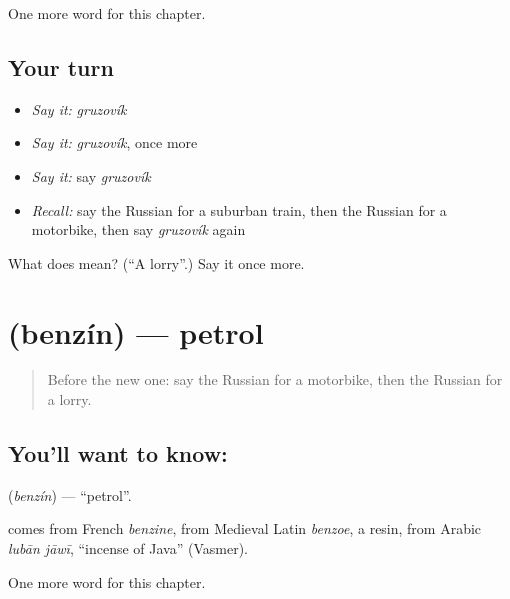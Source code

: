 \begin{grammarlens}[title={What you've built}]
One more word for this chapter.
\end{grammarlens}

\subsection*{Your turn}
\begin{itemize}
\raggedright
  \item \emph{Say it:} \emph{gruzovík}
  \item \emph{Say it:} \emph{gruzovík}, once more
  \item \emph{Say it:} say \emph{gruzovík}
  \item \emph{Recall:} say the Russian for a suburban train, then the Russian for a motorbike, then say \emph{gruzovík} again
\end{itemize}

\begin{tcolorbox}[breakable,colback=teal!4,colframe=teal!35!black,title={Before you move on}]
What does  mean? (\textquotedblleft{}A lorry\textquotedblright{}.) Say it once more.
\end{tcolorbox}
\section[\texorpdfstring{\ru{бензин} (benzín)}{бензин (benzín)}]{ (benzín) — petrol}

\label{lesson:RU-C167-benzin}



\begin{quote}
Before the new one: say the Russian for a motorbike, then the Russian for a lorry.
\end{quote}

\subsection*{You'll want to know: }
\textbf{} (\emph{benzín}) — \textquotedblleft{}petrol\textquotedblright{}.

\begin{cousinweb}
\textbf{} comes from French \emph{benzine}, from Medieval Latin \emph{benzoe}, a resin, from Arabic \emph{lubān jāwī}, \textquotedblleft{}incense of Java\textquotedblright{} (Vasmer).
\end{cousinweb}

\begin{grammarlens}[title={What you've built}]
One more word for this chapter.
\end{grammarlens}

